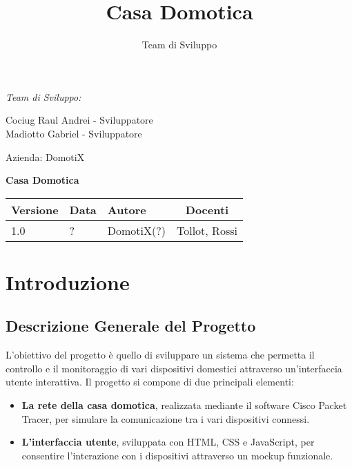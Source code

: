 \documentclass[a4paper,12pt]{article}
\title{Casa Domotica}
\author{Team di Sviluppo}
\date{}
\begin{document}
\begin{titlepage}
    \begin{minipage}[t]{0.4\textwidth}
    \raggedright
    {\large\itshape Team di Sviluppo:\par}
    \vspace{0.2cm}
    
    Cociug Raul Andrei - Sviluppatore \\
    Madiotto Gabriel - Sviluppatore
    \end{minipage}
    \hfill
    \begin{minipage}[t]{0.4\textwidth}
    \raggedleft
    {\Large Azienda: DomotiX\par}
    \end{minipage}
    
    \centering
    \vspace*{5cm}
    
    {\huge\bfseries Casa Domotica\par}
    \vspace{1.5cm}
    
    \vfill
    
    \begin{table}[h]
    \centering
    \begin{tabular}{@{}lllc@{}}
    \toprule
    Versione & Data & Autore & Docenti \\
    \midrule
    1.0 & ? & DomotiX(?) & Tollot, Rossi \\
    \bottomrule
    \end{tabular}
    \end{table}
    
    \thispagestyle{empty}
\end{titlepage}

\tableofcontents
\newpage

\fancyfoot[C]{\thepage}

\section{Introduzione}
\subsection{Descrizione Generale del Progetto}
L'obiettivo del progetto è quello di sviluppare un sistema che permetta il controllo e il monitoraggio di vari dispositivi domestici attraverso un'interfaccia utente interattiva.
Il progetto si compone di due principali elementi:\begin{itemize}
    \item \textbf{La rete della casa domotica}, realizzata mediante il software Cisco Packet Tracer, per simulare la comunicazione tra i vari dispositivi connessi.
    \item \textbf{L'interfaccia utente}, sviluppata con HTML, CSS e JavaScript, per consentire l'interazione con i dispositivi attraverso un mockup funzionale.\end{itemize}
\end{document}
